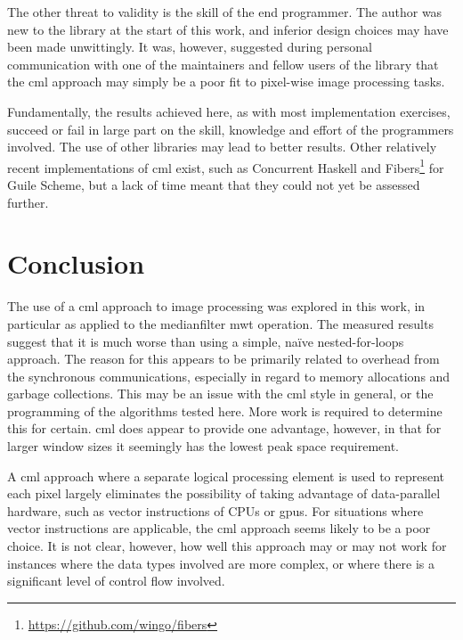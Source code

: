 The other threat to validity is the skill of the end programmer.  The author was new to the \hopac{} library at the start of this work, and inferior design choices may have been made unwittingly.  It was, however, suggested during personal communication with one of the maintainers and fellow users of the \hopac{} library that the \gls{cml} approach may simply be a poor fit to pixel-wise image processing tasks.

Fundamentally, the results achieved here, as with most implementation exercises, succeed or fail in large part on the skill, knowledge and effort of the programmers involved.  The use of other libraries may lead to better results.  Other relatively recent implementations of \gls{cml} exist, such as Concurrent Haskell \cite{Chaudhuri2009} and Fibers\footnote{\url{https://github.com/wingo/fibers}} for Guile Scheme, but a lack of time meant that they could not yet be assessed further.

\section{Conclusion}
The use of a \gls{cml} approach to image processing was explored in this work, in particular as applied to the \gls{medianfilter} \gls{mwt} operation.  The measured results suggest that it is much worse than using a simple, naïve nested-for-loops approach.  The reason for this appears to be primarily related to overhead from the synchronous communications, especially in regard to memory allocations and garbage collections.  This may be an issue with the \gls{cml} style in general,  or the programming of the algorithms tested here.  More work is required to determine this for certain.  \gls{cml} does appear to provide one advantage, however, in that for larger window sizes it seemingly has the lowest peak space requirement.

A \gls{cml} approach where a separate logical processing element is used to represent each pixel largely eliminates the possibility of taking advantage of data-parallel hardware, such as vector instructions of CPUs or \glspl{gpu}.  For situations where vector instructions are applicable, the \gls{cml} approach seems likely to be a poor choice.  It is not clear, however, how well this approach may or may not work for instances where the data types involved are more complex, or where there is a significant level of control flow involved.

